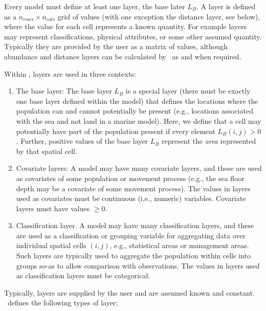 Every model must define at least one layer, the base later $L_B$. A layer is defined as a $n_{rows} \times n_{cols}$ grid of values (with one exception \textemdash the distance layer, see below), where the value for each cell represents a known quantity. For example layers may represent classifications, physical attributes, or some other assumed quantity. Typically they are provided by the user as a matrix of values, although abundance and distance layers can be calculated by \SPM\ as and when required. 

Within \SPM, layers are used in three contexts:
\begin{enumerate}
\item The base layer: The base layer $L_B$ is a special layer (there must be exactly one base layer defined within the model) that defines the locations where the population can and cannot potentially be present (e.g., locations associated with the sea and not land in a marine model). Here, we define that a cell may potentially have part of the population present if every element $L_B(i,j) > 0$. Further, positive values of the base layer $L_B$ represent the \emph{area} represented by that spatial cell. 
\item Covariate layers: A model may have many covariate layers, and these are used as covariates of some population or movement process (e.g., the sea floor depth may be a covariate of some movement process). The values in layers used as covariates must be continuous (i.e., numeric) variables. Covariate layers must have values $\geq 0$.
\item Classification layer. A model may have many classification layers, and these are used as a classification or grouping variable for aggregating data over individual spatial cells $(i,j)$, e.g., statistical areas or management areas. Such layers are typically used to aggregate the population within cells into groups so-as to allow comparison with observations. The values in layers used as classification layers must be categorical.
\end{enumerate}

Typically, layers are supplied by the user and are assumed known and constant. \SPM\ defines the following types of layer;

